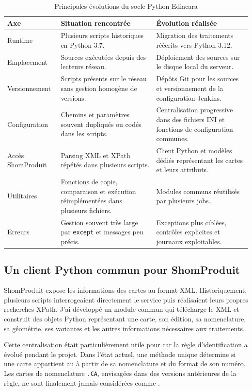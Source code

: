 \begin{table}[H]
\centering
\begin{tabular}{p{3.2cm} p{5.4cm} p{5.4cm}}
\toprule
\textbf{Axe} & \textbf{Situation rencontrée} & \textbf{Évolution réalisée} \\
\midrule
Runtime & Plusieurs scripts historiques en Python 3.7. & Migration des traitements réécrits vers Python 3.12. \\
Emplacement & Sources exécutées depuis des lecteurs réseau. & Déploiement des sources sur le disque local du serveur. \\
Versionnement & Scripts présents sur le réseau sans gestion homogène de versions. & Dépôts Git pour les sources et versionnement de la configuration Jenkins. \\
Configuration & Chemins et paramètres souvent dupliqués ou codés dans les scripts. & Centralisation progressive dans des fichiers INI et fonctions de configuration communes. \\
Accès ShomProduit & Parsing XML et XPath répétés dans plusieurs scripts. & Client Python et modèles dédiés représentant les cartes et leurs attributs. \\
Utilitaires & Fonctions de copie, comparaison et exécution réimplémentées dans plusieurs fichiers. & Modules communs réutilisés par plusieurs jobs. \\
Erreurs & Gestion souvent très large par \texttt{except} et messages peu précis. & Exceptions plus ciblées, contrôles explicites et journaux exploitables. \\
\bottomrule
\end{tabular}
\caption{Principales évolutions du socle Python Ediacara}
\label{tab:modernisation-python}
\end{table}

\subsection{Un client Python commun pour ShomProduit}

ShomProduit expose les informations des cartes au format XML. Historiquement, plusieurs scripts interrogeaient directement le service puis réalisaient leurs propres recherches XPath. J'ai développé un module commun qui télécharge le XML et construit des objets Python représentant une carte, son édition, sa nomenclature, sa géométrie, ses variantes et les autres informations nécessaires aux traitements.

Cette centralisation était particulièrement utile pour  car la règle d'identification a évolué pendant le projet. Dans l'état actuel, une méthode unique détermine si une carte appartient au  à partir de sa nomenclature et du format de son numéro. Les cartes de nomenclature \texttt{.CA}, envisagées dans des versions antérieures de la règle, ne sont finalement jamais considérées comme .

